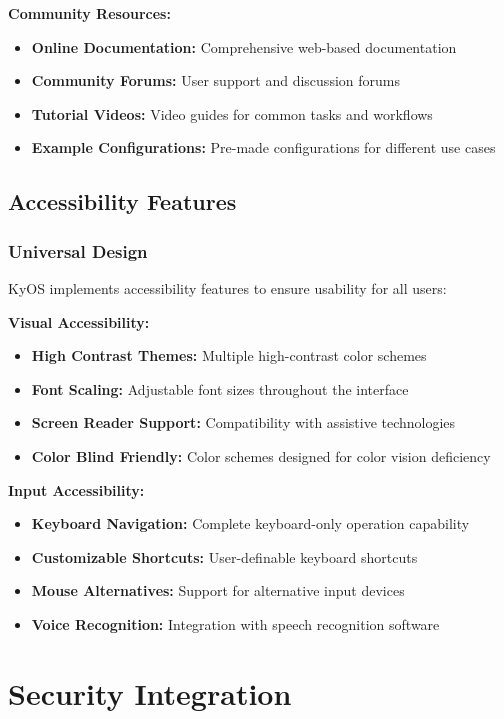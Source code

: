 \documentclass[12pt,a4paper]{article}
\begin{document}
\textbf{Community Resources:}
\begin{itemize}
    \item \textbf{Online Documentation:} Comprehensive web-based documentation
    \item \textbf{Community Forums:} User support and discussion forums
    \item \textbf{Tutorial Videos:} Video guides for common tasks and workflows
    \item \textbf{Example Configurations:} Pre-made configurations for different use cases
\end{itemize}

\subsection{Accessibility Features}

\subsubsection{Universal Design}
KyOS implements accessibility features to ensure usability for all users:

\textbf{Visual Accessibility:}
\begin{itemize}
    \item \textbf{High Contrast Themes:} Multiple high-contrast color schemes
    \item \textbf{Font Scaling:} Adjustable font sizes throughout the interface
    \item \textbf{Screen Reader Support:} Compatibility with assistive technologies
    \item \textbf{Color Blind Friendly:} Color schemes designed for color vision deficiency
\end{itemize}

\textbf{Input Accessibility:}
\begin{itemize}
    \item \textbf{Keyboard Navigation:} Complete keyboard-only operation capability
    \item \textbf{Customizable Shortcuts:} User-definable keyboard shortcuts
    \item \textbf{Mouse Alternatives:} Support for alternative input devices
    \item \textbf{Voice Recognition:} Integration with speech recognition software
\end{itemize}

\section{Security Integration}
\end{document}
